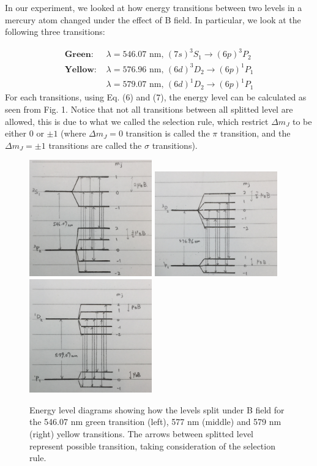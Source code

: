 \documentclass[11pt]{article}
\begin{document}
 In our experiment, we looked at how energy transitions between two levels in a mercury atom changed under the effect of B field. In particular, we look at the following three transitions:
 
\begin{align*}
\textbf{Green: } & \lambda =  546.07 \text{ nm, $(7s)^3 S_1 \rightarrow (6p)^3 P_2$}\\
\textbf{Yellow: } & \lambda =576.96 \text{ nm, $(6d)^3 D_2 \rightarrow (6p)^1 P_1$} \\
& \lambda = 579.07 \text{ nm, $(6d)^1 D_2 \rightarrow (6p)^1 P_1$}
\end{align*}
For each transitions, using Eq. (6) and (7), the energy level can be calculated as seen from Fig. 1. Notice that not all transitions between all splitted level are allowed, this is due to what we called the selection rule, which restrict $\Delta m_J$ to be either $0$ or $\pm 1$ (where $\Delta m_J = 0$ transition is called the $\pi$ transition, and the $\Delta m_J = \pm 1$ transitions are called the $\sigma$ transitions). 

\begin{figure}[H]
\includegraphics[width=5.3cm]{546nm}
\includegraphics[width=5.3cm]{577nm}
\includegraphics[width=5.3cm]{579nm}
\label{Fig. 1}
\caption{Energy level diagrams showing how the levels split under B field for the 546.07 nm green transition (left), 577 nm (middle) and 579 nm (right) yellow transitions. The arrows between splitted level represent possible transition, taking consideration of the selection rule.}
\end{figure}
\end{document}
